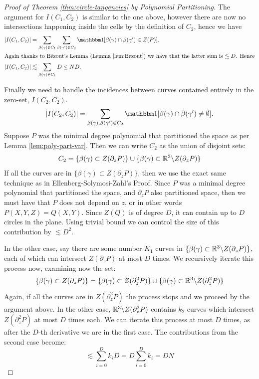 \begin{proof}[Proof of Theorem \ref{thm:circle-tangencies} by Polynomial Partitioning]
The argument for $I(C_1,C_2)$ is similar to the one above, however there are now no intersections happening inside the cells by the definition of $C_2$, hence we have
\begin{align*}
    |I(C_1,C_2)| &= \sum_{\beta(\gamma)\in C_1} \sum_{\beta(\gamma') \in C_2} \OO[\beta(\gamma) \cap \beta(\gamma') \in Z(P)]. \\
    \intertext{Again thanks to Bézout's Lemma (Lemma \ref{lem:Bezout}) we have that the latter sum is $\lesssim D$. Hence}
    |I(C_1,C_2)|& \lesssim \sum_{\beta(\gamma)\in C_1} D \leq ND.
\end{align*}

Finally we need to handle the incidences between curves contained entirely in the zero-set, $I(C_2,C_2)$. 
\[
    |I(C_2,C_2)| = \sum_{\beta(\gamma), \beta(\gamma') \in C_2} \OO[\beta(\gamma) \cap \beta(\gamma') \neq \emptyset].
\]
Suppose $P$ was the minimal degree polynomial that partitioned the space as per Lemma \ref{lem:poly-part-var}. Then we can write $C_2$ as the union of disjoint sets:
\[
C_2 = \{\beta(\gamma) \subset Z(\partial_z P)\} \cup \{\beta(\gamma) \subset \mathbb R^3 \backslash Z(\partial_z P)\}
\]
If all the curves are in $\{\beta(\gamma) \subset Z(\partial_z P)\}$, then we use the exact same technique as in Ellenberg-Solymosi-Zahl's Proof.
Since $P$ was a minimal degree polynomial that partitioned the space, and $\partial_z P$ also partitioned space, then we must have that $P$ does not depend on $z$, or in other words $P(X,Y,Z) = Q(X,Y)$. Since $Z(Q)$ is of degree $D$, it can contain up to $D$ circles in the plane.  Using trivial bound we can control the size of this contribution by $\lesssim D^2$.

In the other case, say there are some number $K_1$ curves in $\{\beta(\gamma) \subset \mathbb R^3 \backslash Z(\partial_z P)\}$, each of which can intersect $ Z(\partial_z P)$ at most $D$ times. 
We recursively iterate this process now, examining now the set: 
\[\{\beta(\gamma) \subset Z(\partial_z P)\} = \{\beta(\gamma) \subset Z(\partial^2_z P)\} \cup \{\beta(\gamma) \subset \mathbb R^3 \backslash Z(\partial^2_z P)\}\]
Again, if all the curves are in $Z(\partial^2_z P)$ the process stops and we proceed by the argument above. In the other case, $\mathbb R^3 \backslash Z(\partial^2_z P)$
contains $k_2$ curves which intersect $ Z(\partial^2_z P)$ at most $D$ times each. We can iterate this process at most $D$ times, as after the $D$-th derivative we are in the first case. The contributions from the second case become:
\[
    \lesssim \sum_{i=0}^D k_i D = D \sum_{i=0}^D k_i = DN
\]


\end{proof}

